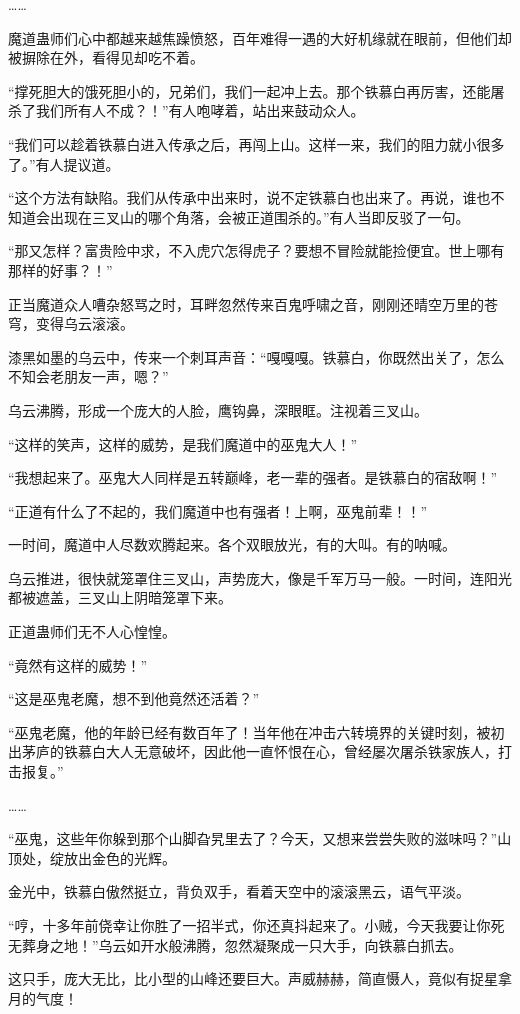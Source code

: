 \begin{this_body}
……

魔道蛊师们心中都越来越焦躁愤怒，百年难得一遇的大好机缘就在眼前，但他们却被摒除在外，看得见却吃不着。

“撑死胆大的饿死胆小的，兄弟们，我们一起冲上去。那个铁慕白再厉害，还能屠杀了我们所有人不成？！”有人咆哮着，站出来鼓动众人。

“我们可以趁着铁慕白进入传承之后，再闯上山。这样一来，我们的阻力就小很多了。”有人提议道。

“这个方法有缺陷。我们从传承中出来时，说不定铁慕白也出来了。再说，谁也不知道会出现在三叉山的哪个角落，会被正道围杀的。”有人当即反驳了一句。

“那又怎样？富贵险中求，不入虎穴怎得虎子？要想不冒险就能捡便宜。世上哪有那样的好事？！”

正当魔道众人嘈杂怒骂之时，耳畔忽然传来百鬼呼啸之音，刚刚还晴空万里的苍穹，变得乌云滚滚。

漆黑如墨的乌云中，传来一个刺耳声音：“嘎嘎嘎。铁慕白，你既然出关了，怎么不知会老朋友一声，嗯？”

乌云沸腾，形成一个庞大的人脸，鹰钩鼻，深眼眶。注视着三叉山。

“这样的笑声，这样的威势，是我们魔道中的巫鬼大人！”

“我想起来了。巫鬼大人同样是五转巅峰，老一辈的强者。是铁慕白的宿敌啊！”

“正道有什么了不起的，我们魔道中也有强者！上啊，巫鬼前辈！！”

一时间，魔道中人尽数欢腾起来。各个双眼放光，有的大叫。有的呐喊。

乌云推进，很快就笼罩住三叉山，声势庞大，像是千军万马一般。一时间，连阳光都被遮盖，三叉山上阴暗笼罩下来。

正道蛊师们无不人心惶惶。

“竟然有这样的威势！”

“这是巫鬼老魔，想不到他竟然还活着？”

“巫鬼老魔，他的年龄已经有数百年了！当年他在冲击六转境界的关键时刻，被初出茅庐的铁慕白大人无意破坏，因此他一直怀恨在心，曾经屡次屠杀铁家族人，打击报复。”

……

“巫鬼，这些年你躲到那个山脚旮旯里去了？今天，又想来尝尝失败的滋味吗？”山顶处，绽放出金色的光辉。

金光中，铁慕白傲然挺立，背负双手，看着天空中的滚滚黑云，语气平淡。

“哼，十多年前侥幸让你胜了一招半式，你还真抖起来了。小贼，今天我要让你死无葬身之地！”乌云如开水般沸腾，忽然凝聚成一只大手，向铁慕白抓去。

这只手，庞大无比，比小型的山峰还要巨大。声威赫赫，简直慑人，竟似有捉星拿月的气度！


\end{this_body}
